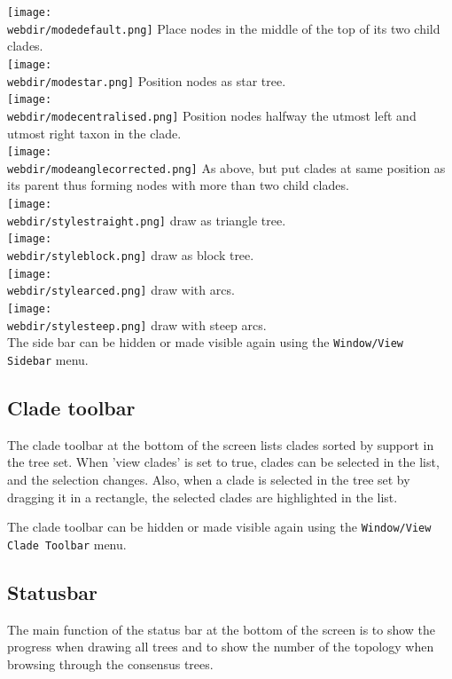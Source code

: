 \documentclass{article}
\def\webdir{/home/remco/research/DensiTree/web}
\begin{document}
\texttt{[image: \\webdir/modedefault.png]} Place nodes in the middle of the top of its two child clades.\\
\texttt{[image: \\webdir/modestar.png]} Position nodes as star tree.\\
\texttt{[image: \\webdir/modecentralised.png]} Position nodes halfway the utmost left and utmost right taxon in the clade.\\
\texttt{[image: \\webdir/modeanglecorrected.png]} As above, but put clades at same position as its parent thus forming nodes with more than two child clades.\\

\texttt{[image: \\webdir/stylestraight.png]} draw as triangle tree.\\
\texttt{[image: \\webdir/styleblock.png]} draw as block tree.\\
\texttt{[image: \\webdir/stylearced.png]} draw with arcs.\\
\texttt{[image: \\webdir/stylesteep.png]} draw with steep arcs.\\

The side bar can be hidden or made visible again using the {\tt Window/View Sidebar} menu.



\subsection{Clade toolbar}

The clade toolbar at the bottom of the screen lists clades sorted by support in the tree set.
When 'view clades' is set to true, clades can be selected in the list, and the
selection changes. Also, when a clade is selected in the tree set by dragging it
in a rectangle, the selected clades are highlighted in the list.

The clade toolbar can be hidden or made visible again using the {\tt Window/View Clade Toolbar} menu.

\subsection{Statusbar}

The main function of the status bar at the bottom of the screen is to show the progress
when drawing all trees and to show the number of the topology when browsing through
the consensus trees.
\end{document}
